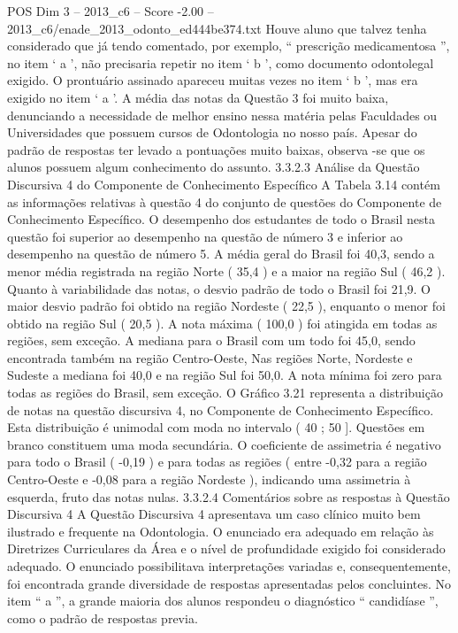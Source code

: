 \begin{textsample}{POS Dim 3 – 2013\_c6 – Score -2.00 – 2013\_c6/enade\_2013\_odonto\_ed444be374.txt}
Houve aluno que talvez tenha considerado que já tendo comentado, por exemplo, “ prescrição medicamentosa ”, no item ‘ a ’, não precisaria repetir no item ‘ b ’, como documento odontolegal exigido.
O prontuário assinado apareceu muitas vezes no item ‘ b ’, mas era exigido no item ‘ a ’.
A média das notas da Questão 3 foi muito baixa, denunciando a necessidade de melhor ensino nessa matéria pelas Faculdades ou Universidades que possuem cursos de Odontologia no nosso país.
Apesar do padrão de respostas ter levado a pontuações muito baixas, observa -se que os alunos possuem algum conhecimento do assunto. 3.3.2.3 Análise da Questão Discursiva 4 do Componente de Conhecimento Específico A Tabela 3.14 contém as informações relativas à questão 4 do conjunto de questões do Componente de Conhecimento Específico.
O desempenho dos estudantes de todo o Brasil nesta questão foi superior ao desempenho na questão de número 3 e inferior ao desempenho na questão de número 5.
A média geral do Brasil foi 40,3, sendo a menor média registrada na região Norte ( 35,4 ) e a maior na região Sul ( 46,2 ).
Quanto à variabilidade das notas, o desvio padrão de todo o Brasil foi 21,9.
O maior desvio padrão foi obtido na região Nordeste ( 22,5 ), enquanto o menor foi obtido na região Sul ( 20,5 ).
A nota máxima ( 100,0 ) foi atingida em todas as regiões, sem exceção.
A mediana para o Brasil com um todo foi 45,0, sendo encontrada também na região Centro-Oeste, Nas regiões Norte, Nordeste e Sudeste a mediana foi 40,0 e na região Sul foi 50,0.
A nota mínima foi zero para todas as regiões do Brasil, sem exceção.
O Gráfico 3.21 representa a distribuição de notas na questão discursiva 4, no Componente de Conhecimento Específico.
Esta distribuição é unimodal com moda no intervalo ( 40 ; 50 ].
Questões em branco constituem uma moda secundária.
O coeficiente de assimetria é negativo para todo o Brasil ( -0,19 ) e para todas as regiões ( entre -0,32 para a região Centro-Oeste e -0,08 para a região Nordeste ), indicando uma assimetria à esquerda, fruto das notas nulas. 3.3.2.4 Comentários sobre as respostas à Questão Discursiva 4 A Questão Discursiva 4 apresentava um caso clínico muito bem ilustrado e frequente na Odontologia.
O enunciado era adequado em relação às Diretrizes Curriculares da Área e o nível de profundidade exigido foi considerado adequado.
O enunciado possibilitava interpretações variadas e, consequentemente, foi encontrada grande diversidade de respostas apresentadas pelos concluintes.
No item “ a ”, a grande maioria dos alunos respondeu o diagnóstico “ candidíase ”, como o padrão de respostas previa.

\end{textsample}
